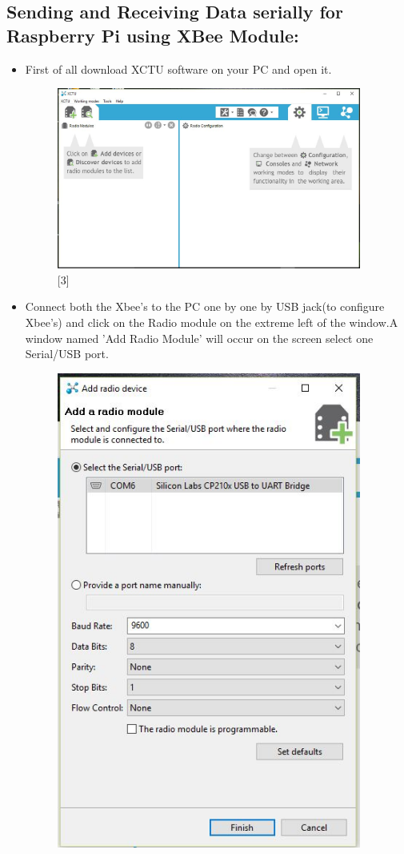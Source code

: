 \documentclass[11pt,a4paper]{article}
\begin{document}
	\subsection{Sending and Receiving Data serially for Raspberry Pi using XBee Module:}
	\begin{itemize}
		\item First of all download XCTU software on your PC and open it.
		\begin{figure}[h!]
			\includegraphics[width=10cm]{Capture1.jpg}
			\centering
			\caption{[3]}
		\end{figure} 
		\item Connect both the Xbee's to the PC one by one by USB jack(to configure Xbee's) and click on the Radio module on the extreme left of the window.A window named 'Add Radio Module' will occur on the screen select one Serial/USB port.
		\begin{figure}[h!]
			\includegraphics[width=10cm]{Capture2.jpg}

\end{figure}
\end{itemize}
\end{document}
